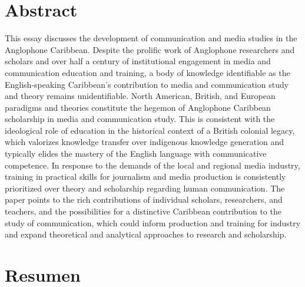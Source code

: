 \documentclass{tufte-handout}
\begin{document}
\begin{titlepage}
\vspace*{2em}

\hypertarget{abstract}{%
\section{Abstract}\label{abstract}}

This essay discusses the development of communication and media studies in the Anglophone Caribbean. Despite the prolific work of Anglophone researchers and scholars and over half a century of institutional engagement in media and communication education and training, a body of knowledge identifiable as the English-speaking Caribbean’s contribution to media and communication study and theory remains unidentifiable. North American, British, and European paradigms and theories constitute the hegemon of Anglophone Caribbean scholarship in media and communication study. This is consistent with the ideological role of education in the historical context of a British colonial legacy, which valorizes knowledge transfer over indigenous knowledge generation and typically elides the mastery of the English language with communicative competence. In response to the demands of the local and regional media industry, training in practical skills for journalism and media production is consistently prioritized over theory and scholarship regarding human communication. The paper points to the rich contributions of individual scholars, researchers, and teachers, and the possibilities for a distinctive Caribbean contribution to the study of communication, which could inform production and training for industry and expand theoretical and analytical approaches to research and scholarship.

\vspace*{2em}


\hypertarget{resumen}{%
\section{Resumen}\label{resumen}}


\end{titlepage}
\end{document}
